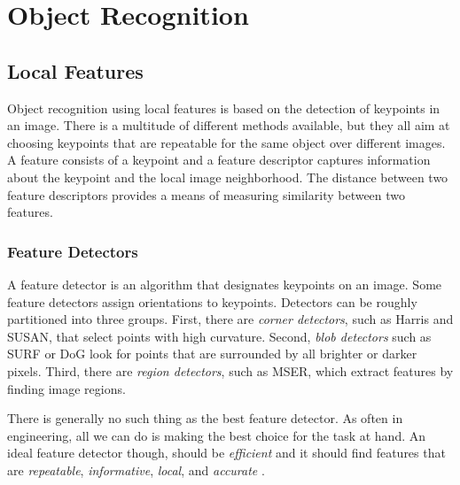 
\section{Object Recognition}


\subsection{Local Features}

Object recognition using local features is based on the detection of keypoints
in an image. There is a multitude of different methods available, but they all
aim at choosing keypoints that are repeatable for the same object over
different images. A feature consists of a keypoint and a feature descriptor
captures information about the keypoint and the local image neighborhood.  The
distance between two feature descriptors provides a means of measuring
similarity between two features. 

\subsubsection{Feature Detectors}

A feature detector is an algorithm that designates keypoints on an image.  Some
feature detectors assign orientations to keypoints. Detectors can be roughly
partitioned into three groups. First, there are {\it corner detectors}, such as
Harris and SUSAN, that select points with high curvature. Second, {\it blob
detectors} such as SURF or DoG look for points that are surrounded by all
brighter or darker pixels.  Third, there are {\it region detectors}, such as
MSER, which extract features by finding image regions.

There is generally no such thing as the best feature detector. As often in
engineering, all we can do is making the best choice for the task at hand.  An
ideal feature detector though, should be {\it efficient} and it should find
features that are {\it repeatable}, {\it informative}, {\it local}, and {\it
accurate} \cite{Tuytelaars2007}.

